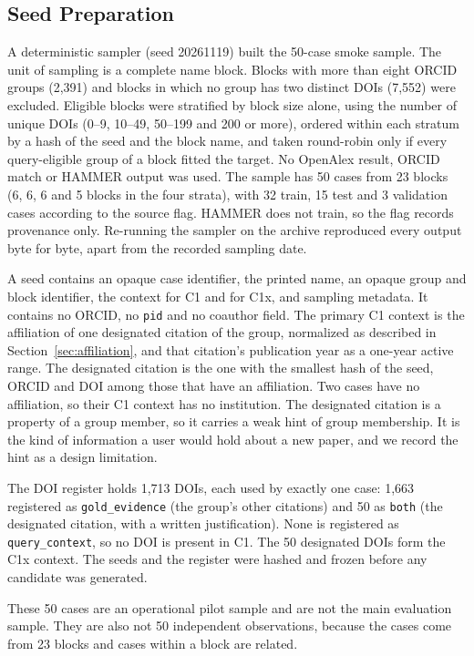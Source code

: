 \subsection{Seed Preparation}
\label{sec:seeds}
A deterministic sampler (seed 20261119) built the 50-case smoke sample. The unit of sampling is a complete name block. Blocks with more than eight ORCID groups (2,391) and blocks in which no group has two distinct DOIs (7,552) were excluded. Eligible blocks were stratified by block size alone, using the number of unique DOIs (0--9, 10--49, 50--199 and 200 or more), ordered within each stratum by a hash of the seed and the block name, and taken round-robin only if every query-eligible group of a block fitted the target. No OpenAlex result, ORCID match or HAMMER output was used. The sample has 50 cases from 23 blocks (6, 6, 6 and 5 blocks in the four strata), with 32 train, 15 test and 3 validation cases according to the source flag. HAMMER does not train, so the flag records provenance only. Re-running the sampler on the archive reproduced every output byte for byte, apart from the recorded sampling date.

A seed contains an opaque case identifier, the printed name, an opaque group and block identifier, the context for C1 and for C1x, and sampling metadata. It contains no ORCID, no \texttt{pid} and no coauthor field. The primary C1 context is the affiliation of one designated citation of the group, normalized as described in Section~\ref{sec:affiliation}, and that citation's publication year as a one-year active range. The designated citation is the one with the smallest hash of the seed, ORCID and DOI among those that have an affiliation. Two cases have no affiliation, so their C1 context has no institution. The designated citation is a property of a group member, so it carries a weak hint of group membership. It is the kind of information a user would hold about a new paper, and we record the hint as a design limitation.

The DOI register holds 1,713 DOIs, each used by exactly one case: 1,663 registered as \texttt{gold\_evidence} (the group's other citations) and 50 as \texttt{both} (the designated citation, with a written justification). None is registered as \texttt{query\_context}, so no DOI is present in C1. The 50 designated DOIs form the C1x context. The seeds and the register were hashed and frozen before any candidate was generated.

These 50 cases are an operational pilot sample and are not the main evaluation sample. They are also not 50 independent observations, because the cases come from 23 blocks and cases within a block are related.

